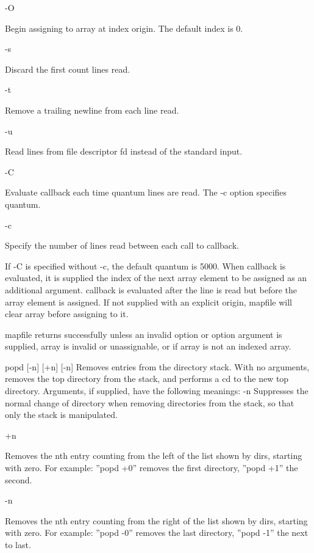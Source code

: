 -O

Begin assigning to array at index origin. The default index is 0.

-s

Discard the first count lines read.

-t

Remove a trailing newline from each line read.

-u

Read lines from file descriptor fd instead of the standard input.

-C

Evaluate callback each time quantum lines are read. The -c option specifies quantum.

-c

Specify the number of lines read between each call to callback.

If -C is specified without -c, the default quantum is 5000. When callback is evaluated, it is supplied the index of the next array element to be assigned as an additional argument. callback is evaluated after the line is read but before the array element is assigned.
If not supplied with an explicit origin, mapfile will clear array before assigning to it.

mapfile returns successfully unless an invalid option or option argument is supplied, array is invalid or unassignable, or if array is not an indexed array.

popd [-n] [+n] [-n]
Removes entries from the directory stack. With no arguments, removes the top directory from the stack, and performs a cd to the new top directory. Arguments, if supplied, have the following meanings:
-n
Suppresses the normal change of directory when removing directories from the stack, so that only the stack is manipulated.

+n

Removes the nth entry counting from the left of the list shown by dirs, starting with zero. For example: ''popd +0'' removes the first directory, ''popd +1'' the second.

-n

Removes the nth entry counting from the right of the list shown by dirs, starting with zero. For example: ''popd -0'' removes the last directory, ''popd -1'' the next to last.

